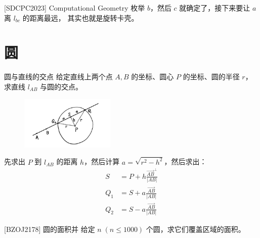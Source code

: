 \documentclass{beamer}
\begin{document}
\begin{frame}{ [SDCPC2023] Computational Geometry}
    \small
    枚举 $b$，然后 $c$ 就确定了，接下来要让 $a$ 离 $l_{bc}$ 的距离最远，
    其实也就是旋转卡壳。
\end{frame}

\section{圆}

\begin{frame}{圆与直线的交点}
    \footnotesize
    给定直线上两个点 $A,B$ 的坐标、圆心 $P$ 的坐标、圆的半径 $r$，
    求直线 $l_{AB}$ 与圆的交点。

    \vspace{1em}\pause
    \begin{figure}[H]
        \centering
        \includegraphics[width=0.4\textwidth]{pic/lineIcircle.jpg}
    \end{figure}
    先求出 $P$ 到 $l_{AB}$ 的距离 $h$，然后计算 $a=\sqrt{r^2-h^2}$，然后求出：
    \begin{align}
        S &= P+h \frac{\overrightarrow{AB}^\perp}{|AB|}\\
        Q_1 &= S + a \frac{\overrightarrow{AB}}{|AB|}\\
        Q_2 &= S - a \frac{\overrightarrow{AB}}{|AB|}
    \end{align}
\end{frame}

\begin{frame}{[BZOJ2178] 圆的面积并}
    给定 $n\;(n\leq 1000)$ 个圆，求它们覆盖区域的面积。
\end{frame}
\end{document}
